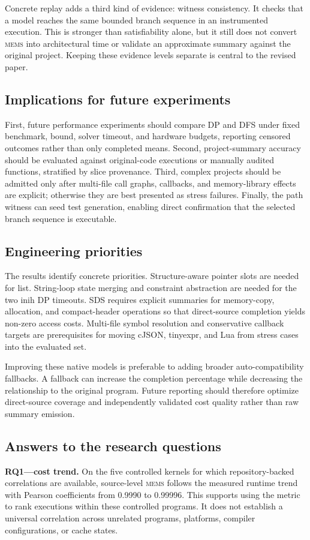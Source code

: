 \documentclass[10pt,conference]{IEEEtran}
\newcommand{\mems}{\textsc{mems}\xspace}
\begin{document}
Concrete replay adds a third kind of evidence: witness consistency. It checks that a model reaches the same bounded branch sequence in an instrumented execution. This is stronger than satisfiability alone, but it still does not convert \mems into architectural time or validate an approximate summary against the original project. Keeping these evidence levels separate is central to the revised paper.

\subsection{Implications for future experiments}
First, future performance experiments should compare DP and DFS under fixed benchmark, bound, solver timeout, and hardware budgets, reporting censored outcomes rather than only completed means. Second, project-summary accuracy should be evaluated against original-code executions or manually audited functions, stratified by slice provenance. Third, complex projects should be admitted only after multi-file call graphs, callbacks, and memory-library effects are explicit; otherwise they are best presented as stress failures. Finally, the path witness can seed test generation, enabling direct confirmation that the selected branch sequence is executable.

\subsection{Engineering priorities}
The results identify concrete priorities. Structure-aware pointer slots are needed for list. String-loop state merging and constraint abstraction are needed for the two inih DP timeouts. SDS requires explicit summaries for memory-copy, allocation, and compact-header operations so that direct-source completion yields non-zero access costs. Multi-file symbol resolution and conservative callback targets are prerequisites for moving cJSON, tinyexpr, and Lua from stress cases into the evaluated set.

Improving these native models is preferable to adding broader auto-compatibility fallbacks. A fallback can increase the completion percentage while decreasing the relationship to the original program. Future reporting should therefore optimize direct-source coverage and independently validated cost quality rather than raw summary emission.

\subsection{Answers to the research questions}
\textbf{RQ1---cost trend.} On the five controlled kernels for which repository-backed correlations are available, source-level \mems follows the measured runtime trend with Pearson coefficients from 0.9990 to 0.99996. This supports using the metric to rank executions within these controlled programs. It does not establish a universal correlation across unrelated programs, platforms, compiler configurations, or cache states.
\end{document}

